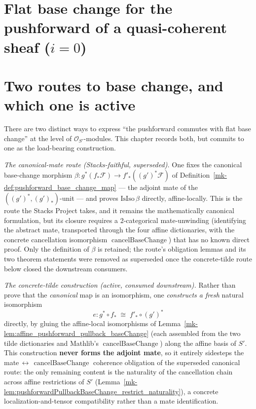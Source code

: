 \section{Flat base change for the pushforward of a quasi-coherent sheaf ($i=0$)}
\label{mk-chap:Cohomology_FlatBaseChange}

\section{Two routes to base change, and which one is active}
\label{mk-sec:fbc_route_decision}

There are two distinct ways to express ``the pushforward commutes with flat base
change'' at the level of \(\mathcal{O}_{S'}\)-modules. This chapter records both, but
commits to one as the load-bearing construction.

\emph{The canonical-mate route (Stacks-faithful, superseded).} One fixes
the canonical base-change morphism
\(\beta : g^*(f_*\mathcal{F}) \to f'_*((g')^*\mathcal{F})\) of
Definition~\ref{mk-def:pushforward_base_change_map} --- the adjoint mate of the
\(((g')^*,(g')_*)\)-unit --- and proves \(\mathrm{IsIso}\,\beta\) directly,
affine-locally. This is the route the Stacks Project takes, and it remains the
mathematically canonical formulation, but its closure requires a \(2\)-categorical
mate-unwinding (identifying the abstract mate, transported through the four affine
dictionaries, with the concrete cancellation isomorphism
\(\operatorname{cancelBaseChange}\)) that has no known direct proof. Only the
definition of \(\beta\) is retained; the route's obligation lemmas and its two
theorem statements were removed as superseded once the concrete-tilde route below
closed the downstream consumers.

\emph{The concrete-tilde construction (active, consumed downstream).} Rather than prove
that the \emph{canonical} map is an isomorphism, one \emph{constructs a fresh} natural
isomorphism
\[
  e : g^* \circ f_* \;\cong\; f'_* \circ (g')^*
\]
directly, by gluing the affine-local isomorphisms of
Lemma~\ref{mk-lem:affine_pushforward_pullback_baseChange} (each assembled from the two
tilde dictionaries and Mathlib's \(\operatorname{cancelBaseChange}\)) along the affine
basis of \(S'\). This construction \textbf{never forms the adjoint mate}, so it
entirely sidesteps the mate\(\,\leftrightarrow\,\operatorname{cancelBaseChange}\)
coherence obligation of the superseded canonical route: the only remaining
content is the naturality of the cancellation chain across affine restrictions of
\(S'\) (Lemma~\ref{mk-lem:pushforwardPullbackBaseChange_restrict_naturality}), a concrete
localization-and-tensor compatibility rather than a mate identification.


